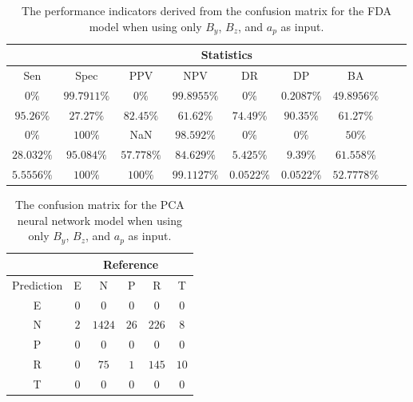 \begin{table}[!ht]
	\centering
	\begin{tabular}{|c|c|c|c|c|c|c|c|c|}
		\hline
		 & \multicolumn{7}{c|}{Statistics} \\ \hline
		Sen & Spec & PPV & NPV & DR & DP & BA \\ \hline
		$0\%$ & $99.7911\%$ & $0\%$ & $99.8955\%$ & $0\%$ & $0.2087\%$ & $49.8956\%$ \\ \hline
		$95.26\%$ & $27.27\%$ & $82.45\%$ & $61.62\%$ & $74.49\%$ & $90.35\%$ & $61.27\%$ \\ \hline
		$0\%$ & $100\%$ & NaN & $98.592\%$ & $0\%$ & $0\%$ & $50\%$ \\ \hline
		$28.032\%$ & $95.084\%$ & $57.778\%$ & $84.629\%$ & $5.425\%$ & $9.39\%$ & $61.558\%$ \\ \hline
		$5.5556\%$ & $100\%$ & $100\%$ & $99.1127\%$ & $0.0522\%$ & $0.0522\%$ & $52.7778\%$ \\ \hline
	\end{tabular}
	\caption{The performance indicators derived from the confusion matrix for the FDA model when using only $B_{y}$, $B_{z}$, and $a_{p}$ as input.}
	\label{tab:cs:yzap:fda}
\end{table}

\begin{table}[!ht]
	\centering
	\begin{tabular}{|c|c|c|c|c|c|}
		\hline
		 & \multicolumn{5}{|c|}{Reference} \\ \hline
		 Prediction & E & N & P & R & T \\ \hline
		 E & $0$ & $0$ & $0$ & $0$ & $0$ \\ \hline
		 N & $2$ & $1424$ & $26$ & $226$ & $8$ \\ \hline
		 P & $0$ & $0$ & $0$ & $0$ & $0$ \\ \hline
		 R & $0$ & $75$ & $1$ & $145$ & $10$ \\ \hline
		 T & $0$ & $0$ & $0$ & $0$ & $0$ \\ \hline
	\end{tabular}
	\caption{The confusion matrix for the PCA neural network model when using only $B_{y}$, $B_{z}$, and $a_{p}$ as input.}
	\label{tab:cm:yzap:pcaNNet}
\end{table}

